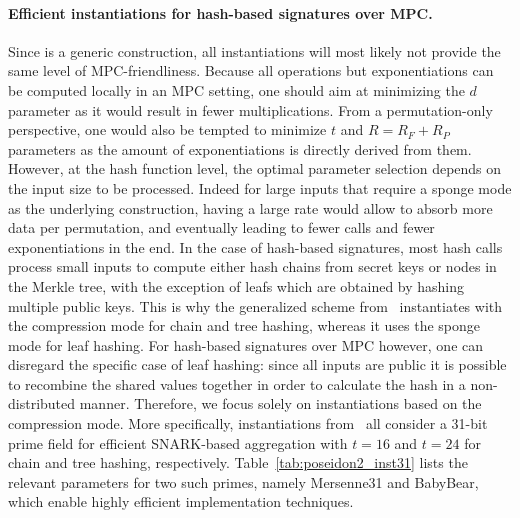 \paragraph{Efficient instantiations for hash-based signatures over MPC.}
Since \PoseidonTwo is a generic construction, all instantiations will most likely not provide the same level of MPC-friendliness.
Because all operations but exponentiations can be computed locally in an MPC setting, one should aim at minimizing the $d$ parameter as it would result in fewer multiplications.
From a permutation-only perspective, one would also be tempted to minimize $t$ and $R = R_F + R_P$ parameters  as the amount of exponentiations is directly derived from them.
However, at the hash function level, the optimal parameter selection depends on the input size to be processed. Indeed for large inputs that require a sponge mode as the underlying construction, having a large rate would allow to absorb more data per permutation, and eventually leading to fewer calls and fewer exponentiations in the end.
In the case of hash-based signatures, most hash calls process small inputs to compute either hash chains from secret keys or nodes in the Merkle tree, with the exception of leafs which are obtained by hashing multiple public keys.
This is why the generalized \XMSS scheme from~\cite{cryptoeprint:2025/055} instantiates \PoseidonTwo with the compression mode for chain and tree hashing, whereas it uses the sponge mode for leaf hashing.
For hash-based signatures over MPC however, one can disregard the specific case of leaf hashing: since all inputs are public it is possible to recombine the shared values together in order to calculate the hash in a non-distributed manner.
Therefore, we focus solely on instantiations based on the compression mode.
More specifically, instantiations from~\cite{cryptoeprint:2025/055} all consider a 31-bit prime field for efficient SNARK-based aggregation with $t = 16$ and $t = 24$ for chain and tree hashing, respectively.
Table~\ref{tab:poseidon2_inst31} lists the relevant parameters for two such primes, namely Mersenne31 and BabyBear, which enable highly efficient implementation techniques.




